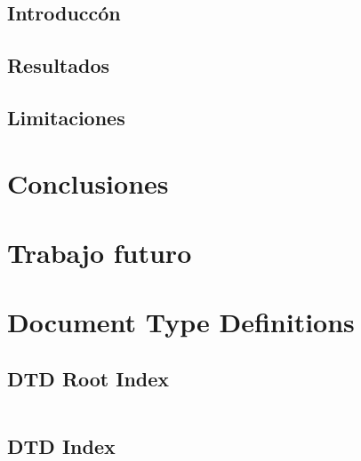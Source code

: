 \documentclass{article}
\begin{document}
\subsection{Introducc\'on}
\subsection{Resultados}
\subsection{Limitaciones}

\newpage
\section{Conclusiones}

\section{Trabajo futuro}



\appendix
\section{Document Type Definitions}

\subsection{DTD Root Index}
\begin{verbatim}

\end{verbatim}

\subsection{DTD Index}
\begin{verbatim}

\end{verbatim}
\end{document}
